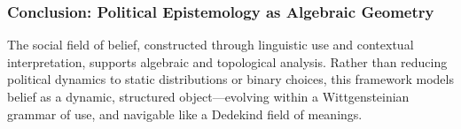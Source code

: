\subsubsection*{Conclusion: Political Epistemology as Algebraic Geometry}

The social field of belief, constructed through linguistic use and contextual interpretation, supports algebraic and topological analysis. Rather than reducing political dynamics to static distributions or binary choices, this framework models belief as a dynamic, structured object—evolving within a Wittgensteinian grammar of use, and navigable like a Dedekind field of meanings.




